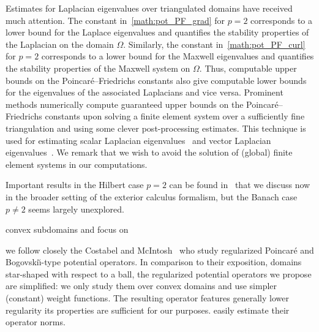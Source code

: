 Estimates for Laplacian eigenvalues over triangulated domains have received much attention. 
The constant in~\eqref{math:pot_PF_grad} for $p=2$ corresponds to a lower bound for the Laplace eigenvalues and quantifies the stability properties of the Laplacian on the domain $\Omega$. 
Similarly, the constant in~\eqref{math:pot_PF_curl} for $p=2$ corresponds to a lower bound for the Maxwell eigenvalues and quantifies the stability properties of the Maxwell system on $\Omega$. 
Thus, computable upper bounds on the Poincar\'e--Friedrichs constants also give computable lower bounds for the eigenvalues of the associated Laplacians and vice versa. 
Prominent methods numerically compute guaranteed upper bounds on the Poincar\'e--Friedrichs constants upon solving a finite element system over a sufficiently fine triangulation and using some clever post-processing estimates.
This technique is used for estimating scalar Laplacian eigenvalues~\cite{Cars_Ged_LB_eigs_14,Liu_fram_eigs_15} and vector Laplacian eigenvalues~\cite{gallistl2023computational}. 
We remark that we wish to avoid the solution of (global) finite element systems in our computations. 



 
 

 
Important results in the Hilbert case $p=2$ can be found in~\cite{guerini2004eigenvalue, Paul_Vald_PF_grad_curl_div_20} that we discuss now in the broader setting of the exterior calculus formalism, 
but the Banach case $p \neq 2$ seems largely unexplored.





 convex subdomains and focus on 





 we follow closely the  Costabel and McIntosh~\cite{costabel2010bogovskiui} who study regularized Poincar\'e and Bogovski\u{\i}-type potential operators. In comparison to their exposition,  domains star-shaped with respect to a ball, the regularized potential operators we propose are simplified: we only study them over convex domains and use simpler (constant) weight functions. 
The resulting operator features generally lower regularity  its properties are sufficient for our purposes.  easily estimate their operator norms. 








